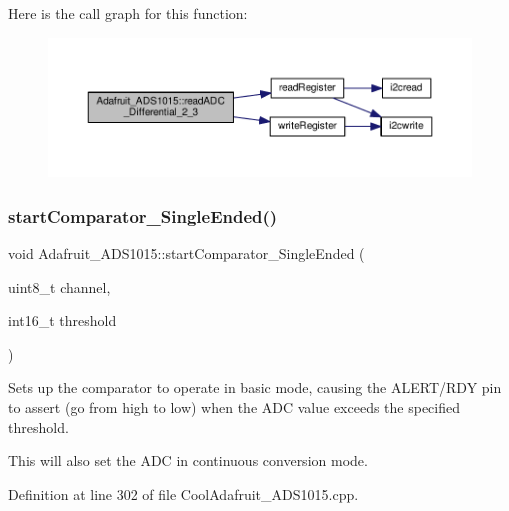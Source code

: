 Here is the call graph for this function\+:\nopagebreak
\begin{figure}[H]
\begin{center}
\leavevmode
\includegraphics[width=350pt]{df/df6/class_adafruit___a_d_s1015_a38311881bcab46f7496c4bb6e4cad576_cgraph}
\end{center}
\end{figure}
\mbox{\label{class_adafruit___a_d_s1015_aecd30775d943ea9d9cff0e3485926596}} 
\subsubsection{\texorpdfstring{start\+Comparator\+\_\+\+Single\+Ended()}{startComparator\_SingleEnded()}}
{\footnotesize\ttfamily void Adafruit\+\_\+\+A\+D\+S1015\+::start\+Comparator\+\_\+\+Single\+Ended (\begin{DoxyParamCaption}\item[{uint8\+\_\+t}]{channel,  }\item[{int16\+\_\+t}]{threshold }\end{DoxyParamCaption})}



Sets up the comparator to operate in basic mode, causing the A\+L\+E\+R\+T/\+R\+DY pin to assert (go from high to low) when the A\+DC value exceeds the specified threshold. 

This will also set the A\+DC in continuous conversion mode. 

Definition at line 302 of file Cool\+Adafruit\+\_\+\+A\+D\+S1015.\+cpp.



